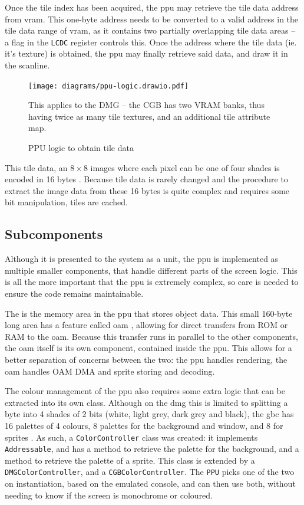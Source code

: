 \documentclass[11pt]{informatics-report}
\begin{document}
Once the tile index has been acquired, the \gls{ppu} may retrieve the tile data address from \gls{vram}. This one-byte address needs to be converted to a valid address in the tile data range of \gls{vram}, as it contains two partially overlapping tile data areas -- a flag in the \texttt{LCDC} register controls this. Once the address where the tile data (ie. it's texture) is obtained, the \gls{ppu} may finally retrieve said data, and draw it in the scanline.

\begin{figure}[h]
    \centering
    \texttt{[image: diagrams/ppu-logic.drawio.pdf]}
    \caption{PPU logic to obtain tile data}
	This applies to the DMG -- the CGB has two VRAM banks, thus having twice as many tile textures, and an additional tile attribute map.
    \label{fig:ppu-tile-logic}
\end{figure}

This tile data, an $8 \times 8$ images where each pixel can be one of four shades is encoded in 16 bytes \cite[VRAM Tile Data]{pandoc}. Because tile data is rarely changed and the procedure to extract the image data from these 16 bytes is quite complex and requires some bit manipulation, tiles are cached.


\subsection{Subcomponents}

Although it is presented to the system as a unit, the \gls{ppu} is implemented as multiple smaller components, that handle different parts of the screen logic. This is all the more important that the \gls{ppu} is extremely complex, so care is needed to ensure the code remains maintainable.

The  is the memory area in the \gls{ppu} that stores object data. This small 160-byte long area has a feature called \gls{oam} , allowing for direct transfers from ROM or RAM to the \gls{oam}. Because this transfer runs in parallel to the other components, the \gls{oam} itself is its own component, contained inside the \gls{ppu}. This allows for a better separation of concerns between the two: the \gls{ppu} handles rendering, the \gls{oam} handles OAM DMA and sprite storing and decoding.

The colour management of the \gls{ppu} also requires some extra logic that can be extracted into its own class. Although on the \gls{dmg} this is limited to splitting a byte into 4 shades of 2 bits (white, light grey, dark grey and black), the \gls{gbc} has 16 palettes of 4 colours, 8 palettes for the background and window, and 8 for sprites \cite[Palettes]{pandoc}. As such, a \texttt{ColorController} class was created: it implements \texttt{Addressable}, and has a method to retrieve the palette for the background, and a method to retrieve the palette of a sprite. This class is extended by a \texttt{DMGColorController}, and a \texttt{CGBColorController}. The \texttt{PPU} picks one of the two on instantiation, based on the emulated console, and can then use both, without needing to know if the screen is monochrome or coloured.
\end{document}

